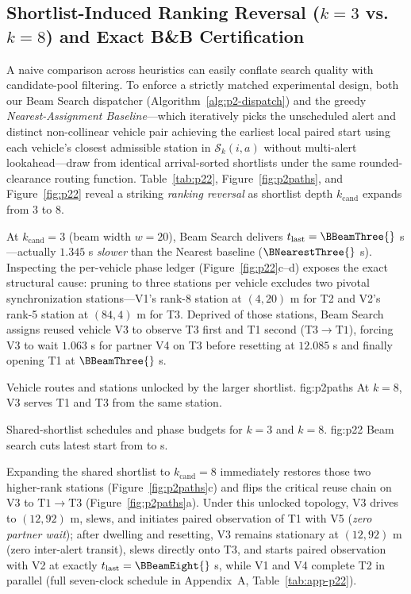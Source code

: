 \subsection{Shortlist-Induced Ranking Reversal ($k=3$ vs.\ $k=8$) and Exact B\&B Certification}
A naive comparison across heuristics can easily conflate search quality with candidate-pool filtering. To enforce a strictly matched experimental design, both our Beam Search dispatcher (Algorithm~\ref{alg:p2-dispatch}) and the greedy \emph{Nearest-Assignment Baseline}—which iteratively picks the unscheduled alert and distinct non-collinear vehicle pair achieving the earliest local paired start using each vehicle's closest admissible station in $\mathcal{S}_k(i,a)$ without multi-alert lookahead—draw from identical arrival-sorted shortlists under the same rounded-clearance routing function. Table~\ref{tab:p22}, Figure~\ref{fig:p2paths}, and Figure~\ref{fig:p22} reveal a striking \emph{ranking reversal} as shortlist depth $k_{\mathrm{cand}}$ expands from $3$ to $8$.

At $k_{\mathrm{cand}}=3$ (beam width $w=20$), Beam Search delivers $t_{\mathrm{last}}=\BBeamThree{}$ s—actually $1.345$ s \emph{slower} than the Nearest baseline ($\BNearestThree{}$ s). Inspecting the per-vehicle phase ledger (Figure~\ref{fig:p22}c--d) exposes the exact structural cause: pruning to three stations per vehicle excludes two pivotal synchronization stations—V1's rank-8 station at $(4,20)$ m for T2 and V2's rank-5 station at $(84,4)$ m for T3. Deprived of those stations, Beam Search assigns reused vehicle V3 to observe T3 first and T1 second ($\mathrm{T3}\!\to\!\mathrm{T1}$), forcing V3 to wait $1.063$ s for partner V4 on T3 before resetting at $12.085$ s and finally opening T1 at $\BBeamThree{}$ s.

{Vehicle routes and stations unlocked by the larger shortlist.}
{fig:p2paths}
{At $k=8$, V3 serves T1 and T3 from the same station.}

{Shared-shortlist schedules and phase budgets for $k=3$ and $k=8$.}
{fig:p22}
{Beam search cuts latest start from \BBeamThree{} to \BBeamEight{} s.}

Expanding the shared shortlist to $k_{\mathrm{cand}}=8$ immediately restores those two higher-rank stations (Figure~\ref{fig:p2paths}c) and flips the critical reuse chain on V3 to $\mathrm{T1}\!\to\!\mathrm{T3}$ (Figure~\ref{fig:p2paths}a). Under this unlocked topology, V3 drives to $(12,92)$ m, slews, and initiates paired observation of T1 with V5 (\emph{zero partner wait}); after dwelling and resetting, V3 remains stationary at $(12,92)$ m (zero inter-alert transit), slews directly onto T3, and starts paired observation with V2 at exactly $t_{\mathrm{last}}=\BBeamEight{}$ s, while V1 and V4 complete T2 in parallel (full seven-clock schedule in Appendix~A, Table~\ref{tab:app-p22}).

